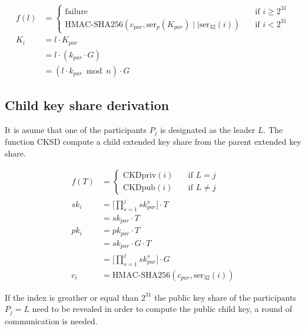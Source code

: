 \begin{equation*}
\begin{split}
  f(l) &=
  \begin{cases}
    \text{failure} & \quad \text{if } i \geq 2^{31}\\
    \text{HMAC-SHA256}(c_{par}, \text{ser}_{p}(K_{par})
    \mid\mid \text{ser}_{32}(i)) & \quad \text{if } i < 2^{31}
  \end{cases} \\
  K_i &= l \cdot K_{par}\\
      &= l \cdot (k_{par} \cdot G)\\
      &= (l \cdot k_{par} \bmod n) \cdot G
\end{split}
\end{equation*}

\subsection{Child key share derivation}
It is asume that one of the participants $P_j$ is designated as the leader $L$.
The function CKSD compute a child extended key share from the parent
extended key share.

\begin{equation*}
\begin{split}
  f(T) &=
  \begin{cases}
    \text{CKDpriv}(i) & \quad \text{if } L = j\\%
    \text{CKDpub}(i) & \quad \text{if } L \neq j
  \end{cases} \\
  sk_i &= \Bigg[ \prod_{s=1}^{j} sk_{par}^{s} \Bigg] \cdot T \\
       &= sk_{par} \cdot T \\
  pk_i &= pk_{par} \cdot T \\
       &= sk_{par} \cdot G \cdot T \\
       &= \Bigg[ \prod_{s=1}^{j} sk_{par}^{s} \Bigg] \cdot G \\
  c_i &= \text{HMAC-SHA256}(c_{par}, \text{ser}_{32}(i))
\end{split}
\end{equation*}

If the index is greather or equal than $2^{31}$
the public key share of the participants $P_j = L$ need to be
revealed in order to compute the public child key, a round of communication is
needed.


